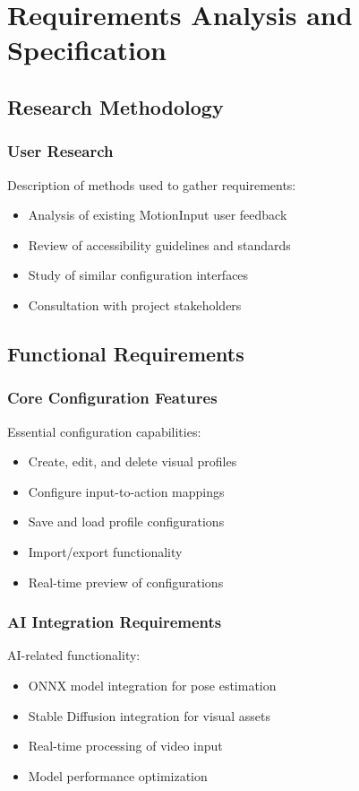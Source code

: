 \chapter{Requirements Analysis and Specification}

\section{Research Methodology}
\subsection{User Research}
Description of methods used to gather requirements:
\begin{itemize}
    \item Analysis of existing MotionInput user feedback
    \item Review of accessibility guidelines and standards
    \item Study of similar configuration interfaces
    \item Consultation with project stakeholders
\end{itemize}

\section{Functional Requirements}
\subsection{Core Configuration Features}
Essential configuration capabilities:
\begin{itemize}
    \item Create, edit, and delete visual profiles
    \item Configure input-to-action mappings
    \item Save and load profile configurations
    \item Import/export functionality
    \item Real-time preview of configurations
\end{itemize}

\subsection{AI Integration Requirements}
AI-related functionality:
\begin{itemize}
    \item ONNX model integration for pose estimation
    \item Stable Diffusion integration for visual assets
    \item Real-time processing of video input
    \item Model performance optimization
\end{itemize}

